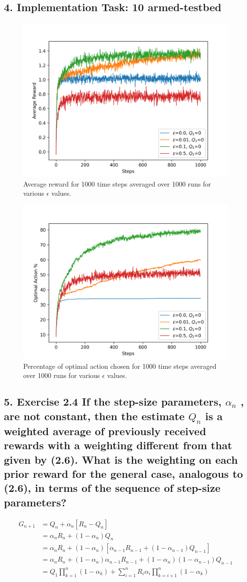 \subsection*{4. Implementation Task: 10 armed-testbed}
\begin{figure}[h]
\centering
\includegraphics[width=0.6\linewidth]{./averageReward.png}
\caption{Average reward for 1000 time steps averaged over 1000 runs for various $\epsilon$ values.}
\end{figure}
\begin{figure}[h]
\centering
\includegraphics[width=0.6\linewidth]{./optimalAction.png}
\caption{Percentage of optimal action chosen for 1000 time steps averaged over 1000 runs for various $\epsilon$ values.}
\end{figure}
\newpage
\subsection*{5. Exercise 2.4 If the step-size parameters, $\alpha_n$ , are not constant, then the estimate $Q_n$ is a weighted average of previously received rewards with a weighting different from that given by (2.6). What is the weighting on each prior reward for the general case, analogous to (2.6), in terms of the sequence of step-size parameters?}
\begin{align*}
G_{n+1} &= Q_n + \alpha_n [R_n - Q_n] \\
&= \alpha_n R_n + (1 - \alpha_n)Q_n \\
&= \alpha_n R_n + (1 - \alpha_n)[\alpha_{n-1} R_{n-1} + (1-\alpha_{n-1})Q_{n-1}] \\
&= \alpha_n R_n + (1 - \alpha_n)\alpha_{n-1} R_{n-1} + (1 - \alpha_{n})(1 - \alpha_{n-1})Q_{n-1} \\
&= Q_1 \prod_{k=1}^{n} (1- \alpha_k) + \sum_{i = 1}^n R_i \alpha_i \prod_{k = i + 1}^n (1 - \alpha_k)
\end{align*}
